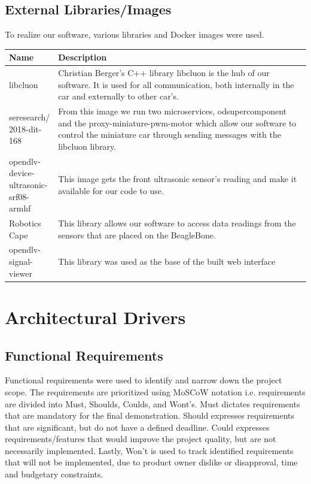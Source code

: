 \documentclass[12pt]{article}
\begin{document}
\subsection{External Libraries/Images}
To realize our software, various libraries and Docker images were used.

\begin{longtable}{ | p{0.15\linewidth} | p{0.85\linewidth} | }\hline 
	\textbf{Name} & \textbf{Description} \\ \hline
	libcluon\cite{libcluon} & Christian Berger's C++ library libcluon is the hub of our software. It is used for all communication, both internally in the car and externally to other car's.\\ \hline
    seresearch/ 2018-dit-168 & From this image we run two microservices, odsupercomponent and the proxy-miniature-pwm-motor which allow our software to control the miniature car through sending messages with the libcluon library.\\ \hline
	opendlv-device-ultrasonic-srf08-armhf & This image gets the front ultrasonic sensor's reading and make it available for our code to use.\\ \hline
    Robotics Cape\cite{robotics cape} & This library allows our software to access data readings from the sensors that are placed on the BeagleBone.\\ \hline
    opendlv-signal-viewer\cite{signal viewer} & This library was used as the base of the built web interface\\ \hline
\end{longtable}

\pagebreak


\section{Architectural Drivers}
\subsection{Functional Requirements}
Functional requirements were used to identify and narrow down the project scope. The requirements are prioritized using MoSCoW notation i.e. requirements are divided into Must, Shoulds, Coulds, and Wont’s. Must dictates requirements that are mandatory for the final demonstration. Should expresses requirements that are significant, but do not have a defined deadline. Could expresses requirements/features that would improve the project quality, but are not necessarily implemented. Lastly, Won’t is used to track identified requirements that will not be implemented, due to product owner dislike or disapproval, time and budgetary constraints.\par
\end{document}
